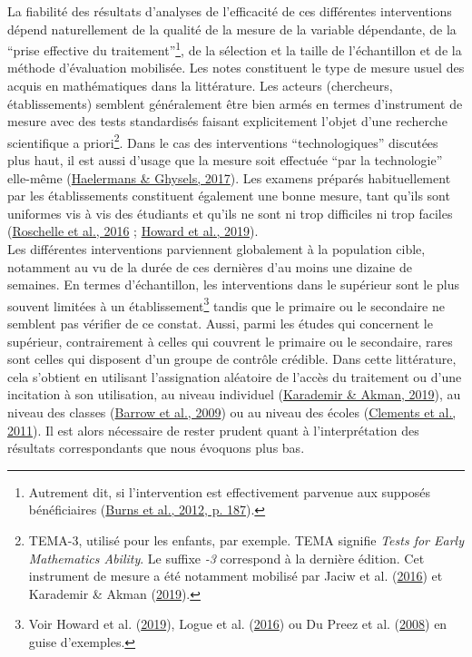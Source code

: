 \documentclass[
]{book}
\begin{document}
\quad La fiabilité des résultats d'analyses de l'efficacité de ces différentes interventions dépend naturellement de la qualité de la mesure de la variable dépendante, de la ``prise effective du traitement''\footnote{Autrement dit, si l'intervention est effectivement parvenue aux supposés bénéficiaires (\protect\hyperlink{ref-BUR:eal:12}{Burns et al., 2012, p. 187}).}, de la sélection et la taille de l'échantillon et de la méthode d'évaluation mobilisée. Les notes constituent le type de mesure usuel des acquis en mathématiques dans la littérature. Les acteurs (chercheurs, établissements) semblent généralement être bien armés en termes d'instrument de mesure avec des tests standardisés faisant explicitement l'objet d'une recherche scientifique a priori\footnote{TEMA-3, utilisé pour les enfants, par exemple. TEMA signifie \emph{Tests for Early Mathematics Ability}. Le suffixe \emph{-3} correspond à la dernière édition. Cet instrument de mesure a été notamment mobilisé par Jaciw et al. (\protect\hyperlink{ref-JAC:eal:16}{2016}) et Karademir \& Akman (\protect\hyperlink{ref-KAR:AKM:19}{2019}).}. Dans le cas des interventions ``technologiques'' discutées plus haut, il est aussi d'usage que la mesure soit effectuée ``par la technologie'' elle-même (\protect\hyperlink{ref-HAE:GHY:17}{Haelermans \& Ghysels, 2017}). Les examens préparés habituellement par les établissements constituent également une bonne mesure, tant qu'ils sont uniformes vis à vis des étudiants et qu'ils ne sont ni trop difficiles ni trop faciles (\protect\hyperlink{ref-ROS:eal:16}{Roschelle et al., 2016} ; \protect\hyperlink{ref-HOW:eal:19}{Howard et al., 2019}).\\
Les différentes interventions parviennent globalement à la population cible, notamment au vu de la durée de ces dernières d'au moins une dizaine de semaines.
En termes d'échantillon, les interventions dans le supérieur sont le plus souvent limitées à un établissement\footnote{Voir Howard et al. (\protect\hyperlink{ref-HOW:eal:19}{2019}), Logue et al. (\protect\hyperlink{ref-LOG:eal:16}{2016}) ou Du Preez et al. (\protect\hyperlink{ref-DUP:eal:08}{2008}) en guise d'exemples.} tandis que le primaire ou le secondaire ne semblent pas vérifier de ce constat.
Aussi, parmi les études qui concernent le supérieur, contrairement à celles qui couvrent le primaire ou le secondaire, rares sont celles qui disposent d'un groupe de contrôle crédible. Dans cette littérature, cela s'obtient en utilisant l'assignation aléatoire de l'accès du traitement ou d'une incitation à son utilisation, au niveau individuel (\protect\hyperlink{ref-KAR:AKM:19}{Karademir \& Akman, 2019}), au niveau des classes (\protect\hyperlink{ref-BAR:eal:09}{Barrow et al., 2009}) ou au niveau des écoles (\protect\hyperlink{ref-CLE:eal:11}{Clements et al., 2011}). Il est alors nécessaire de rester prudent quant à l'interprétation des résultats correspondants que nous évoquons plus bas.
\end{document}
